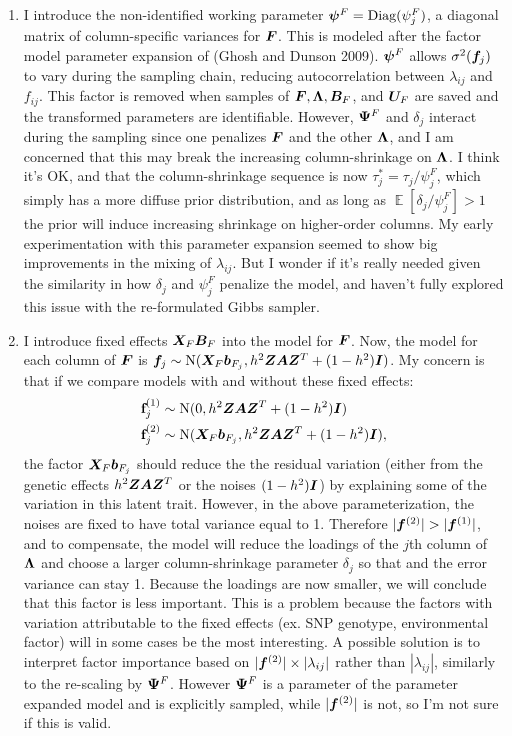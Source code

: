 \documentclass[11pt]{amsart}
\newcommand*{\B}[1]{\ifmmode\bm{#1}\else\textbf{#1}\fi}
\DeclareMathOperator{\E}{\mathbb{E}}
\begin{document}
\begin{enumerate}

\item I introduce the non-identified working parameter $\B{\psi}^F = \mbox{Diag}(\psi^F_j)$, a diagonal matrix of column-specific variances for $\B{F}$. This is modeled after the factor model parameter expansion of (Ghosh and Dunson 2009). $\B{\psi}^F$ allows $\sigma^2(\B{f}_j)$ to vary during the sampling chain, reducing autocorrelation between $\lambda_{ij}$ and $f_{ij}$. This factor is removed when samples of $\B{F}, \B{\Lambda}, \B{B}_F$, and $\B{U}_F$ are saved and the transformed parameters are identifiable. However, $\B{\Psi}^F$ and ${\delta_j}$ interact during the sampling since one penalizes $\B{F}$ and the other $\B{\Lambda}$, and I am concerned that this may break the increasing column-shrinkage on $\B{\Lambda}$. I think it's OK, and that the column-shrinkage sequence is now ${\tau^*_j} = {\tau_j / \psi^F_j}$, which simply has a more diffuse prior distribution, and as long as $\E[\delta_j/\psi^F_j]>1$ the prior will induce increasing shrinkage on higher-order columns. My early experimentation with this parameter expansion seemed to show big improvements in the mixing of $\lambda_{ij}$. But I wonder if it's really needed given the similarity in how $\delta_j$ and $\psi^F_j$ penalize the model, and haven't fully explored this issue with the re-formulated Gibbs sampler.

\item I introduce fixed effects $\B{X}_F\B{B}_F$ into the model for $\B{F}$. Now, the model for each column of $\B{F}$ is $\B{f}_j \sim \mbox{N}(\B{X}_F\B{b}_{F_j},h^2\B{ZAZ}^T + (1-h^2)\B{I})$. My concern is that if we compare models with and without these fixed effects: 
\begin{align*}
\B{f}^{(1)}_j &\sim \mbox{N}(0, h^2\B{ZAZ}^T + (1-h^2)\B{I}) \\
\B{f}^{(2)}_j &\sim \mbox{N}(\B{X}_F\B{b}_{F_j},h^2\B{ZAZ}^T + (1-h^2)\B{I}),
\end{align*}
\noindent the factor $\B{X}_F\B{b}_{F_j}$ should reduce the the residual variation (either from the genetic effects $h^2\B{ZAZ}^T$ or the noises $(1-h^2)\B{I}$) by explaining some of the variation in this latent trait. However, in the above parameterization, the noises are fixed to have total variance equal to 1. Therefore $|\B{f}^{(2)}| > |\B{f}^{(1)}|$, and to compensate, the model will reduce the loadings of the $j$th column of $\B{\Lambda}$ and choose a larger column-shrinkage parameter $\delta_j$ so that  and the error variance can stay 1. Because the loadings are now smaller, we will conclude that this factor is less important. This is a problem because the factors with variation attributable to the fixed effects (ex. SNP genotype, environmental factor) will in some cases be the most interesting. A possible solution is to interpret factor importance based on $|\B{f}^{(2)}| \times |\lambda_{ij}|$ rather than $|\lambda_{ij}|$, similarly to the re-scaling by $\B{\Psi}^F$. However $\B{\Psi}^F$ is a parameter of the parameter expanded model and is explicitly sampled, while $|\B{f}^{(2)}|$ is not, so I'm not sure if this is valid.

\end{enumerate}
\end{document}
